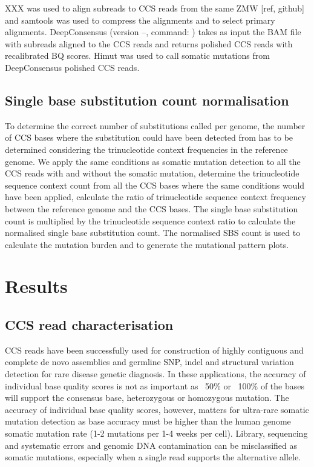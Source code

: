 XXX was used to align subreads to CCS reads from the same ZMW [ref, github] and samtools was used to compress the alignments and to select primary alignments. DeepConsensus (version --, command: ) \cite{Baid2022-or} takes as input the BAM file with subreads aligned to the CCS reads and returns polished CCS reads with recalibrated BQ scores. Himut was used to call somatic mutations from DeepConsensus polished CCS reads. 

\subsection{Single base substitution count normalisation}
To determine the correct number of substitutions called per genome, the number of CCS bases where the substitution could have been detected from has to be determined considering the trinucleotide context frequencies in the reference genome. We apply the same conditions as somatic mutation detection to all the CCS reads with and without the somatic mutation, determine the trinucleotide sequence context count from all the CCS bases where the same conditions would have been applied, calculate the ratio of trinucleotide sequence context frequency between the reference genome and the CCS bases. The single base substitution count is multiplied by the trinucleotide sequence context ratio to calculate the normalised single base substitution count. The normalised SBS count is used to calculate the mutation burden and to generate the mutational pattern plots. 

\section{Results}

\subsection{CCS read characterisation}

CCS reads have been successfully used for construction of highly contiguous and complete de novo assemblies and germline SNP, indel and structural variation detection for rare disease genetic diagnosis. In these applications, the accuracy of individual base quality scores is not as important as ~50\% or ~100\% of the bases will support the consensus base, heterozygous or homozygous mutation. The accuracy of individual base quality scores, however, matters for ultra-rare somatic mutation detection as base accuracy must be higher than the human genome somatic mutation rate (1-2 mutations per 1-4 weeks per cell). Library, sequencing and systematic errors and genomic DNA contamination can be misclassified as somatic mutations, especially when a single read supports the alternative allele. 

